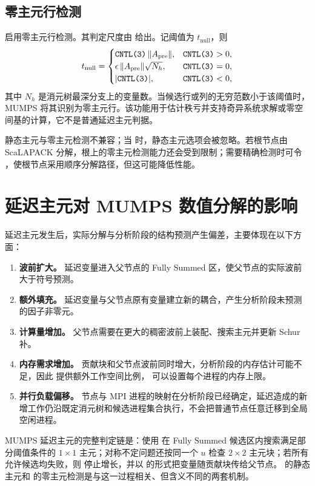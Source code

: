\subsection{零主元行检测}

 启用零主元行检测。其判定尺度由  给出。记阈值为 $t_{\mathrm{null}}$，则
\[
t_{\mathrm{null}}=
\begin{cases}
\texttt{CNTL(3)}\,\|A_{\mathrm{pre}}\|, & \texttt{CNTL(3)}>0,\\
\epsilon\,\|A_{\mathrm{pre}}\|\sqrt{N_h}, & \texttt{CNTL(3)}=0,\\
|\texttt{CNTL(3)}|, & \texttt{CNTL(3)}<0,
\end{cases}
\]
其中 $N_h$ 是消元树最深分支上的变量数。当候选行或列的无穷范数小于该阈值时，MUMPS 将其识别为零主元行。该功能用于估计秩亏并支持奇异系统求解或零空间基的计算，它不是普通延迟主元判据。

静态主元与零主元检测不兼容；当  时，静态主元选项会被忽略。若根节点由 ScaLAPACK 分解，根上的零主元检测能力还会受到限制；需要精确检测时可令 ，使根节点采用顺序分解路径，但这可能降低性能\cite{mumpsguide}。

\section{延迟主元对 MUMPS 数值分解的影响}

延迟主元发生后，实际分解与分析阶段的结构预测产生偏差，主要体现在以下方面：

\begin{enumerate}
  \item \textbf{波前扩大。} 延迟变量进入父节点的 Fully Summed 区，使父节点的实际波前大于符号预测。
  \item \textbf{额外填充。} 延迟变量与父节点原有变量建立新的耦合，产生分析阶段未预测的因子非零元。
  \item \textbf{计算量增加。} 父节点需要在更大的稠密波前上装配、搜索主元并更新 Schur 补。
  \item \textbf{内存需求增加。} 贡献块和父节点波前同时增大，分析阶段的内存估计可能不足，因此  提供额外工作空间比例， 可以设置每个进程的内存上限。
  \item \textbf{并行负载偏移。} 节点与 MPI 进程的映射在分析阶段已经确定，延迟造成的新增工作仍沿既定消元树和候选进程集合执行，不会把普通节点任意迁移到全局空闲进程。
\end{enumerate}

\begin{keypoint}
MUMPS 延迟主元的完整判定链是：使用  在 Fully Summed 候选区内搜索满足部分阈值条件的 $1\times1$ 主元；对称不定问题还按同一个 $u$ 检查 $2\times2$ 主元块；若所有允许候选均失败，则  停止增长，并以  的形式把变量随贡献块传给父节点。 的静态主元和  的零主元检测是与这一过程相关、但含义不同的两套机制。
\end{keypoint}
